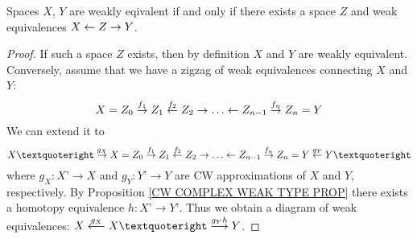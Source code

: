 \begin{corollary}
Spaces $X$, $Y$ are weakly eqivalent if and only if there exists a space 
$Z$ and weak equivalences $X \leftarrow Z \rightarrow Y$. 
\end{corollary}

\begin{proof} 
If such a space $Z$ exists, then by definition $X$ and $Y$ are weakly equivalent. 
Conversely, assume that we have a zigzag of weak equivalences connecting $X$ and $Y$:
\[
X = Z_{0} \overset{f_{1}}{\ra} Z_{1} 
\overset{f_{2}}{\la} Z_{2} \ra \dots 
\la Z_{n-1} \overset{f_{n}}{\ra} Z_{n} = Y
\]
We can extend it to 
\[
X’ \overset{g_{X}}{\ra}
X = Z_{0} \overset{f_{1}}{\ra} Z_{1} 
\overset{f_{2}}{\la} Z_{2} \ra \dots 
\la Z_{n-1} \overset{f_{n}}{\ra} Z_{n} = Y
\overset{g_{Y}}{\la} Y’
\]
where $g_{X}\colon X’\to X$ and $g_{Y}\colon Y’\to Y$ are CW approximations 
of $X$ and $Y$, respectively. By Proposition \ref{CW COMPLEX WEAK TYPE PROP}
there exists a homotopy equivalence $h\colon X’ \to Y’$. Thus we obtain 
a diagram of weak equivalences:
$X \overset{g_{X}}{\longleftarrow} X’ \overset{g_{Y}h}{\lra} Y$.
\end{proof}

